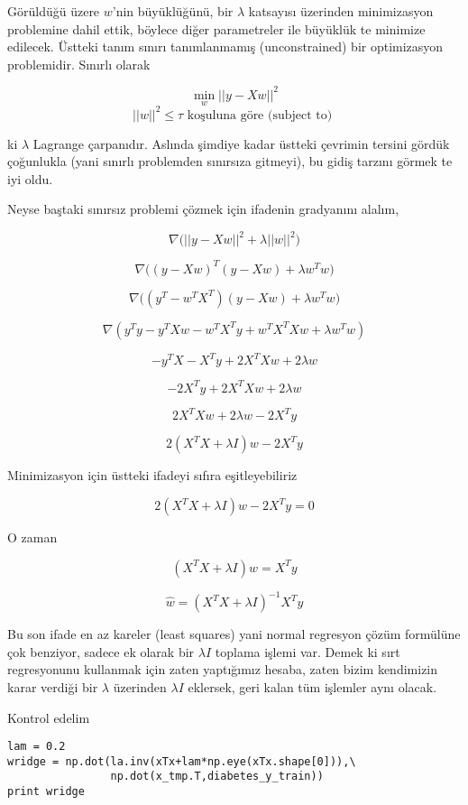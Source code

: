 \documentclass[12pt,fleqn]{article}\usepackage{../../common}
\begin{document}
Görüldüğü üzere $w$'nin büyüklüğünü, bir $\lambda$ katsayısı üzerinden
minimizasyon problemine dahil ettik, böylece diğer parametreler ile büyüklük te
minimize edilecek. Üstteki tanım sınırı tanımlanmamış (unconstrained) bir
optimizasyon problemidir. Sınırlı olarak

$$ \min_w ||y-Xw||^2  $$
$$ ||w||^2 \le \tau \textrm{ koşuluna göre (subject to) }$$

ki $\lambda$ Lagrange çarpanıdır. Aslında şimdiye kadar üstteki
çevrimin tersini gördük çoğunlukla (yani sınırlı problemden sınırsıza
gitmeyi), bu gidiş tarzını görmek te iyi oldu.

Neyse baştaki sınırsız problemi çözmek için ifadenin gradyanını alalım,

$$ \nabla \big( ||y-Xw||^2 + \lambda||w||^2 \big) $$

$$ \nabla \big( (y-Xw)^T (y-Xw) + \lambda w^Tw \big) $$

$$ \nabla \big(  (y^T-w^TX^T)(y-Xw) + \lambda w^Tw  \big) $$

$$ \nabla ( y^Ty - y^TXw - w^TX^Ty + w^TX^TXw + \lambda w^Tw   )  $$

$$  - y^TX - X^Ty + 2X^TXw + 2\lambda w   $$

$$  - 2X^Ty + 2X^TXw + 2\lambda w   $$

$$   2X^TXw + 2\lambda w - 2X^Ty   $$

$$   2(X^TX + \lambda I ) w - 2X^Ty   $$

Minimizasyon için üstteki ifadeyi sıfıra eşitleyebiliriz

$$   2(X^TX + \lambda I ) w - 2X^Ty  = 0 $$

O zaman

$$   (X^TX + \lambda I ) w = X^Ty  $$

$$   \hat{w} = (X^TX + \lambda I)^{-1} X^Ty  $$

Bu son ifade en az kareler (least squares) yani normal regresyon çözüm
formülüne çok benziyor, sadece ek olarak bir $\lambda I$ toplama
işlemi var.  Demek ki sırt regresyonunu kullanmak için zaten
yaptığımız hesaba, zaten bizim kendimizin karar verdiği bir $\lambda$
üzerinden $\lambda I$ eklersek, geri kalan tüm işlemler aynı olacak. 

Kontrol edelim

\begin{verbatim}
lam = 0.2
wridge = np.dot(la.inv(xTx+lam*np.eye(xTx.shape[0])),\
                np.dot(x_tmp.T,diabetes_y_train))
print wridge
\end{verbatim}
\end{document}
